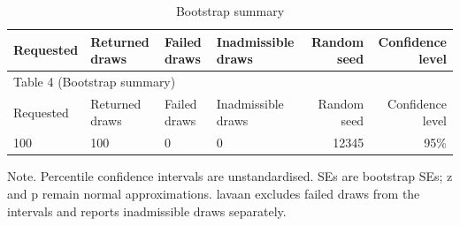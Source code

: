 \documentclass[11pt]{article}
\begin{document}
\small
\begin{longtable}{llllrr}
\caption{Bootstrap summary}\\
\toprule
Requested & Returned draws & Failed draws & Inadmissible draws & Random seed & Confidence level \\
\midrule
\endfirsthead
\multicolumn{6}{l}{Table 4 (Bootstrap summary)} \\
\toprule
Requested & Returned draws & Failed draws & Inadmissible draws & Random seed & Confidence level \\
\midrule
\endhead
100 & 100 & 0 & 0 & 12345 & 95\% \\
\bottomrule
\end{longtable}
\noindent Note. Percentile confidence intervals are unstandardised. SEs are bootstrap SEs; z and p remain normal approximations. lavaan excludes failed draws from the intervals and reports inadmissible draws separately.\par
\end{document}
